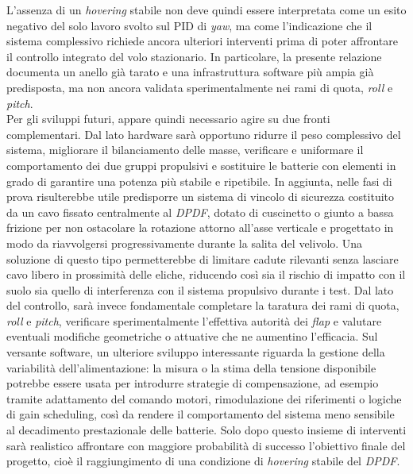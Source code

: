 \documentclass[11pt]{report}
\begin{document}
	L'assenza di un \textit{hovering} stabile non deve quindi essere interpretata come un esito negativo del solo lavoro svolto sul PID di \textit{yaw}, ma come l'indicazione che il sistema complessivo richiede ancora ulteriori interventi prima di poter affrontare il controllo integrato del volo stazionario. In particolare, la presente relazione documenta un anello già tarato e una infrastruttura software più ampia già predisposta, ma non ancora validata sperimentalmente nei rami di quota, \textit{roll} e \textit{pitch}.\\
	Per gli sviluppi futuri, appare quindi necessario agire su due fronti complementari. Dal lato hardware sarà opportuno ridurre il peso complessivo del sistema, migliorare il bilanciamento delle masse, verificare e uniformare il comportamento dei due gruppi propulsivi e sostituire le batterie con elementi in grado di garantire una potenza più stabile e ripetibile. In aggiunta, nelle fasi di prova risulterebbe utile predisporre un sistema di vincolo di sicurezza costituito da un cavo fissato centralmente al \textit{DPDF}, dotato di cuscinetto o giunto a bassa frizione per non ostacolare la rotazione attorno all'asse verticale e progettato in modo da riavvolgersi progressivamente durante la salita del velivolo. Una soluzione di questo tipo permetterebbe di limitare cadute rilevanti senza lasciare cavo libero in prossimità delle eliche, riducendo così sia il rischio di impatto con il suolo sia quello di interferenza con il sistema propulsivo durante i test. Dal lato del controllo, sarà invece fondamentale completare la taratura dei rami di quota, \textit{roll} e \textit{pitch}, verificare sperimentalmente l'effettiva autorità dei \textit{flap} e valutare eventuali modifiche geometriche o attuative che ne aumentino l'efficacia. Sul versante software, un ulteriore sviluppo interessante riguarda la gestione della variabilità dell'alimentazione: la misura o la stima della tensione disponibile potrebbe essere usata per introdurre strategie di compensazione, ad esempio tramite adattamento del comando motori, rimodulazione dei riferimenti o logiche di gain scheduling, così da rendere il comportamento del sistema meno sensibile al decadimento prestazionale delle batterie. Solo dopo questo insieme di interventi sarà realistico affrontare con maggiore probabilità di successo l'obiettivo finale del progetto, cioè il raggiungimento di una condizione di \textit{hovering} stabile del \textit{DPDF}.
	
	
	
\end{document}
